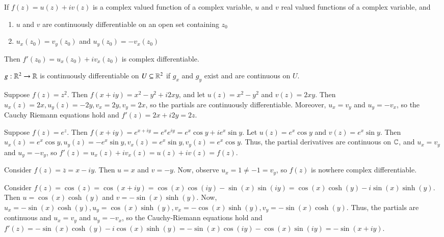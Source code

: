 \begin{theorem}
    If $f(z) = u(z) + iv(z)$ is a complex valued function of a complex variable, $u$ and $v$ real valued functions of a complex variable, and \begin{enumerate}
        \item $u$ and $v$ are continuously differentiable on an open set containing $z_0$
        \item $u_x(z_0) = v_y(z_0)$ and $u_y(z_0) = -v_x(z_0)$
    \end{enumerate}
    Then $f'(z_0) = u_x(z_0)+iv_x(z_0)$ is complex differentiable.
\end{theorem}

\begin{definition}
    $g:\mathbb R^2\rightarrow \mathbb R$ is continuously differentiable on $U \subseteq \mathbb R^2$ if $g_x$ and $g_y$ exist and are continuous on $U$.
\end{definition}

\begin{example}
    Suppose $f(z) = z^2$. Then $f(x+iy) = x^2-y^2 + i2xy$, and let $u(z) = x^2-y^2$ and $v(z) = 2xy$. Then $u_x(z) = 2x, u_y(z) = -2y, v_x = 2y, v_y = 2x$, so the partials are continuously differentiable. Moreover, $u_x = v_y$ and $u_y = -v_x$, so the Cauchy Riemann equations hold and $f'(z) = 2x+i2y = 2z$.
\end{example}

\begin{example}
    Suppose $f(z) = e^z$. Then $f(x+iy) = e^{x+iy} = e^xe^{iy} = e^x\cos y + ie^x\sin y$. Let $u(z) = e^x\cos y$ and $v(z) = e^x\sin y$. Then $u_x(z) = e^x\cos y, u_y(z) = -e^x\sin y, v_x(z) = e^x\sin y, v_y(z) = e^x\cos y$. Thus, the partial derivatives are continuous on $\mathbb C$, and $u_x = v_y$ and $u_y = -v_y$, so $f'(z) = u_x(z)+iv_x(z) = u(z)+iv(z) = f(z)$.
\end{example}

\begin{example}
    Consider $f(z) = \overline{z} = x-iy$. Then $u = x$ and $v = -y$. Now, observe $u_x = 1 \neq -1 = v_y$, so $f(z)$ is nowhere complex differentiable.
\end{example}


\begin{example}
    Consider $f(z) = \cos(z) = \cos(x+iy) = \cos(x)\cos(iy)-\sin(x)\sin(iy) = \cos(x)\cosh(y) - i\sin(x)\sinh(y)$. Then $u = \cos(x)\cosh(y)$ and $v = -\sin(x)\sinh(y)$. Now, $u_x = -\sin(x)\cosh(y), u_y = \cos(x)\sinh(y), v_x = -\cos(x)\sinh(y), v_y = -\sin(x)\cosh(y)$. Thus, the partials are continuous and $u_x = v_y$ and $u_y = -v_x$, so the Cauchy-Riemann equations hold and $f'(z) = -\sin(x)\cosh(y)-i\cos(x)\sinh(y) = -\sin(x)\cos(iy)-\cos(x)\sin(iy) = -\sin(x+iy)$.
\end{example}

